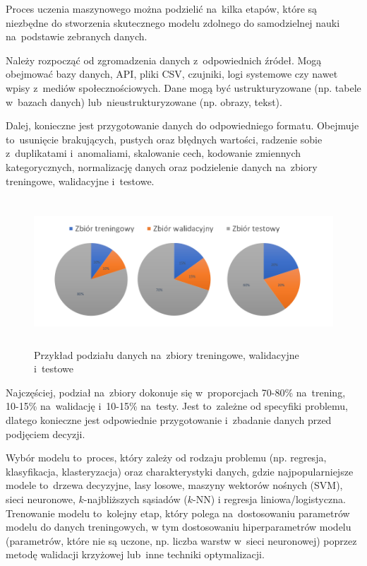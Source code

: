Proces uczenia maszynowego można podzielić na~kilka etapów,
które są niezbędne do stworzenia skutecznego modelu zdolnego do samodzielnej nauki na~podstawie zebranych danych.

Należy rozpocząć od zgromadzenia danych z~odpowiednich źródeł.
Mogą obejmować bazy danych, API, pliki CSV, czujniki, logi systemowe czy nawet wpisy z~mediów społecznościowych.
Dane mogą być ustrukturyzowane (np. tabele w~bazach danych) lub~nieustrukturyzowane (np. obrazy, tekst).

Dalej, konieczne jest przygotowanie danych do odpowiedniego formatu.
Obejmuje to~usunięcie brakujących, pustych oraz błędnych wartości,
radzenie sobie z~duplikatami i~anomaliami, skalowanie cech, kodowanie zmiennych kategorycznych,
normalizację danych oraz podzielenie danych na~zbiory treningowe, walidacyjne i~testowe.

\begin{figure}[ht]
	\centering
	\includegraphics[height=5.5cm]{resources/machine-learning/images/process_1.png}
	\caption{Przykład podziału danych na~zbiory treningowe, walidacyjne i~testowe}
    \label{Fig:ml-process-1}
\end{figure}
\FloatBarrier

Najczęściej, podział na~zbiory dokonuje się w~proporcjach 70-80\% na~trening, 10-15\% na~walidację i~10-15\% na~testy.
Jest to~zależne od specyfiki problemu,
dlatego konieczne jest odpowiednie przygotowanie i~zbadanie danych przed podjęciem decyzji.

Wybór modelu to~proces, który zależy od rodzaju problemu (np. regresja, klasyfikacja, klasteryzacja)
oraz charakterystyki danych, gdzie najpopularniejsze modele to~drzewa decyzyjne,
lasy losowe, maszyny wektorów nośnych (SVM), sieci neuronowe, $k$-najbliższych sąsiadów ($k$-NN)
i regresja liniowa/logistyczna. Trenowanie modelu to~kolejny etap,
który polega na~dostosowaniu parametrów modelu do danych treningowych,
w tym dostosowaniu hiperparametrów modelu (parametrów, które nie są uczone,
np. liczba warstw w~sieci neuronowej) poprzez metodę walidacji krzyżowej lub~inne techniki optymalizacji.

